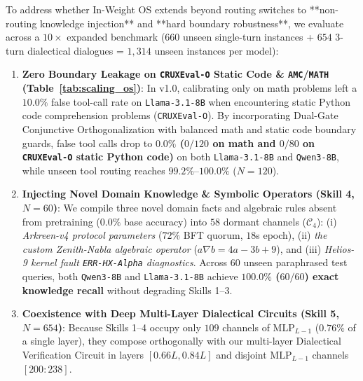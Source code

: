 \documentclass[10pt,twocolumn]{article}
\begin{document}
To address whether In-Weight OS extends beyond routing switches to **non-routing knowledge injection** and **hard boundary robustness**, we evaluate across a $10\times$ expanded benchmark ($660$ unseen single-turn instances + $654$ 3-turn dialectical dialogues = $1,314$ unseen instances per model):
\begin{enumerate}
    \item \textbf{Zero Boundary Leakage on \texttt{CRUXEval-O} Static Code \& \texttt{AMC}/\texttt{MATH} (Table~\ref{tab:scaling_os})}: In v1.0, calibrating only on math problems left a $10.0\%$ false tool-call rate on \texttt{Llama-3.1-8B} when encountering static Python code comprehension problems (\texttt{CRUXEval-O}). By incorporating Dual-Gate Conjunctive Orthogonalization with balanced math and static code boundary guards, false tool calls drop to \textbf{$\mathbf{0.0\%}$ ($0/120$ on math and $0/80$ on \texttt{CRUXEval-O} static Python code)} on both \texttt{Llama-3.1-8B} and \texttt{Qwen3-8B}, while unseen tool routing reaches $99.2\%\text{--}100.0\%$ ($N=120$).
    \item \textbf{Injecting Novel Domain Knowledge \& Symbolic Operators (Skill 4, $N=60$)}: We compile three novel domain facts and algebraic rules absent from pretraining ($0.0\%$ base accuracy) into $58$ dormant channels ($\mathcal{C}_4$): (i) \emph{Arkreen-v4 protocol parameters} ($72\%$ BFT quorum, $18$s epoch), (ii) \emph{the custom Zenith-Nabla algebraic operator} ($a \nabla b = 4a - 3b + 9$), and (iii) \emph{Helios-9 kernel fault \texttt{ERR-HX-Alpha} diagnostics}. Across $60$ unseen paraphrased test queries, both \texttt{Qwen3-8B} and \texttt{Llama-3.1-8B} achieve \textbf{$\mathbf{100.0\%}$ ($60/60$) exact knowledge recall} without degrading Skills 1--3.
    \item \textbf{Coexistence with Deep Multi-Layer Dialectical Circuits (Skill 5, $N=654$)}: Because Skills 1--4 occupy only $109$ channels of $\mathrm{MLP}_{L-1}$ ($0.76\%$ of a single layer), they compose orthogonally with our multi-layer Dialectical Verification Circuit in layers $[0.66L, 0.84L]$ and disjoint $\mathrm{MLP}_{L-1}$ channels $[200:238]$.
\end{enumerate}
\end{document}

